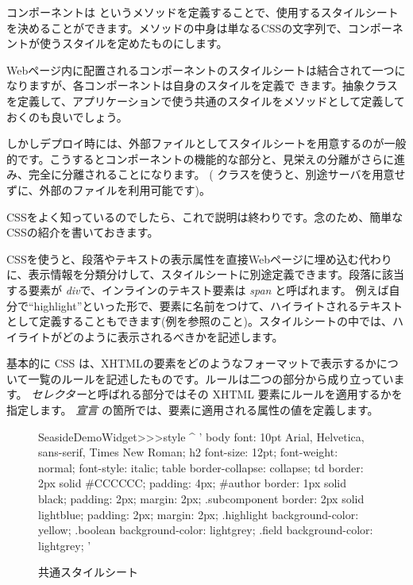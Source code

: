 \documentclass[a4paper,10pt,twoside]{book}
\begin{document}
コンポーネントは というメソッドを定義することで、使用するスタイルシートを決めることができます。メソッドの中身は単なるCSSの文字列で、コンポーネントが使うスタイルを定めたものにします。

Webページ内に配置されるコンポーネントのスタイルシートは結合されて一つになりますが、各コンポーネントは自身のスタイルを定義で
きます。抽象クラスを定義して、アプリケーションで使う共通のスタイルをメソッドとして定義しておくのも良いでしょう。

しかしデプロイ時には、外部ファイルとしてスタイルシートを用意するのが一般的です。こうするとコンポーネントの機能的な部分と、見栄えの分離がさらに進み、完全に分離されることになります。
( クラスを使うと、別途サーバを用意せずに、外部のファイルを利用可能です)。

CSSをよく知っているのでしたら、これで説明は終わりです。念のため、簡単なCSSの紹介を書いておきます。

CSSを使うと、段落やテキストの表示属性を直接Webページに埋め込む代わりに、表示情報を分類分けして、スタイルシートに別途定義できます。段落に該当する要素が \emph{div}で、インラインのテキスト要素は \emph{span} と呼ばれます。
例えば自分で``highlight''といった形で、要素に名前をつけて、ハイライトされるテキストとして定義することもできます(例を参照のこと)。スタイルシートの中では、ハイライトがどのように表示されるべきかを記述します。

基本的に CSS は、XHTMLの要素をどのようなフォーマットで表示するかについて一覧のルールを記述したものです。ルールは二つの部分から成り立っています。
 \emph{セレクター}と呼ばれる部分ではその XHTML 要素にルールを適用するかを指定します。 \emph{宣言} の箇所では、要素に適用される属性の値を定義します。

\begin{figure}[tb]
\begin{code}{}
SeasideDemoWidget>>>style
	^ '
body {
	font: 10pt Arial, Helvetica, sans-serif, Times New Roman;
}
h2 {
	font-size: 12pt;
	font-weight: normal;
	font-style: italic;
}
table { border-collapse: collapse; }
td {
	border: 2px solid #CCCCCC;
	padding: 4px;
}
#author {
	border: 1px solid black;
	padding: 2px;
	margin: 2px;
}
.subcomponent {
	border: 2px solid lightblue;
	padding: 2px;
	margin: 2px;
}
.highlight { background-color: yellow; }
.boolean { background-color: lightgrey; }
.field { background-color: lightgrey; }
'
\end{code}
\caption{ 共通スタイルシート
}
\end{figure}
\end{document}
